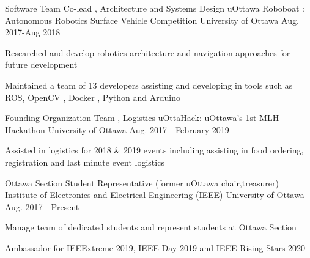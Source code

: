 

\begin{cventries}


  \cventry
    {Software Team Co-lead , Architecture and Systems Design } %
    {uOttawa Roboboat : Autonomous Robotics Surface Vehicle Competition } %
    {University of Ottawa } %
    {Aug. 2017-Aug 2018} %
    {
      \begin{cvitems} %
        \item {Researched and develop robotics architecture and navigation approaches for future development}
        \item { Maintained a team of 13 developers assisting and developing  in tools such as ROS, OpenCV , Docker , Python and Arduino }
      \end{cvitems}    
    }


  \cventry
    {Founding Organization Team , Logistics } %
    {uOttaHack: uOttawa's 1st MLH Hackathon } %
    {University of Ottawa } %
    {Aug. 2017 - February 2019} %
    {
      \begin{cvitems} %
        \item { Assisted in logistics for 2018 \& 2019 events including assisting in food ordering, registration and last minute event logistics }
      \end{cvitems}    
     }

  \cventry
    {Ottawa Section Student Representative (former uOttawa chair,treasurer)  } %
    {Institute of Electronics and Electrical Engineering (IEEE) } %
    {University of Ottawa} %
    {Aug. 2017 - Present } %
    {
      \begin{cvitems} %
        \item {Manage team of dedicated students and represent students at Ottawa Section }
        \item {Ambassador for IEEExtreme 2019, IEEE Day 2019 and IEEE Rising Stars 2020}

      \end{cvitems}    
    }


\end{cventries}
